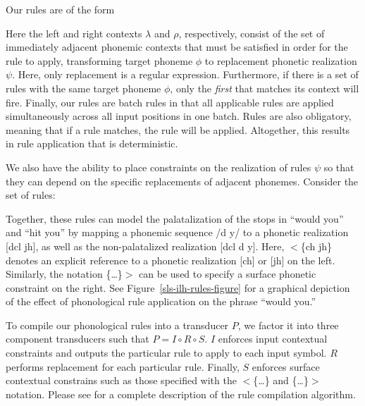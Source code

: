 Our rules are of the form
\begin{slsilhrules}
\end{slsilhrules}
Here the left and right contexts $\lambda$ and $\rho$, respectively,
consist of the set of immediately adjacent phonemic contexts that must
be satisfied in order for the rule to apply, transforming target
phoneme $\phi$ to replacement phonetic realization $\psi$.  Here, only
replacement is a regular expression.  Furthermore, if there is a set
of rules with the same target phoneme $\phi$, only the \emph{first}
that matches its context will fire.  Finally, our rules are batch
rules in that all applicable rules are applied simultaneously across
all input positions in one batch.  Rules are also obligatory, meaning
that if a rule matches, the rule will be applied.  Altogether, this
results in rule application that is deterministic.

We also have the ability to place constraints on the realization of
rules $\psi$ so that they can depend on the specific replacements of
adjacent phonemes.  Consider the set of rules:
\begin{slsilhrules}
\end{slsilhrules}
Together, these rules can model the palatalization of the stops in
``would you'' and ``hit you'' by mapping a phonemic sequence /d y/ to
a phonetic realization [dcl jh], as well as the non-palatalized
realization [dcl d y].  Here, $<$\{ch jh\} denotes an explicit
reference to a phonetic realization [ch] or [jh] on the left.
Similarly, the notation \{\ldots\}$>$ can be used to specify a surface
phonetic constraint on the right.  See
Figure~\ref{sls-ilh-rules-figure} for a graphical depiction of the
effect of phonological rule application on the phrase ``would you.''

To compile our phonological rules into a transducer $P$, we factor it
into three component transducers such that $P = I \circ R \circ S$.
$I$ enforces input contextual constraints and outputs the particular
rule to apply to each input symbol.  $R$ performs replacement for each
particular rule.  Finally, $S$ enforces surface contextual constrains
such as those specified with the $<$\{\ldots\} and \{\ldots\}$>$
notation.  Please see \cite{Hetherington01} for a complete description
of the rule compilation algorithm.


